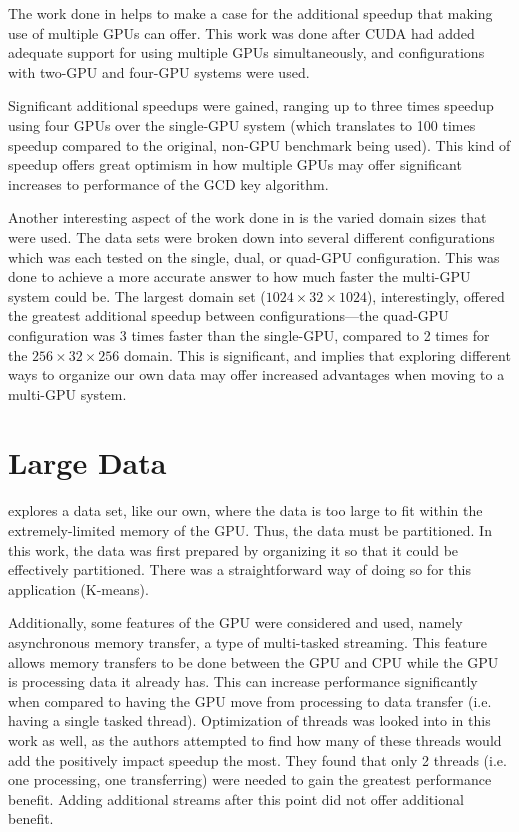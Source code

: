 \documentclass[12pt]{ucthesis}
\begin{document}
The work done in \cite{thibault2009cuda} helps to make a case for the
additional speedup that making use of multiple GPUs can offer. This work was
done after CUDA had added adequate support for using multiple GPUs
simultaneously, and configurations with two-GPU and four-GPU systems were used.

Significant additional speedups were gained, ranging up to three times speedup
using four GPUs over the single-GPU system (which translates to 100 times
speedup compared to the original, non-GPU benchmark being used). This kind of
speedup offers great optimism in how multiple GPUs may offer significant
increases to performance of the GCD key algorithm.

Another interesting aspect of the work done in \cite{thibault2009cuda} is the
varied domain sizes that were used. The data sets were broken down into several
different configurations which was each tested on the single, dual, or quad-GPU
configuration. This was done to achieve a more accurate answer to how much
faster the multi-GPU system could be. The largest domain set
($1024\times32\times1024$), interestingly, offered the greatest additional
speedup between configurations---the quad-GPU configuration was 3 times faster
than the single-GPU, compared to 2 times for the $256\times32\times256$
domain. This is significant, and implies that exploring different ways to
organize our own data may offer increased advantages when moving to a multi-GPU
system.

\section{Large Data}
\label{subsec:largedata}
\cite{wu2009clustering} explores a data set, like our own, where the data is
too large to fit within the extremely-limited memory of the GPU. Thus, the data
must be partitioned. In this work, the data was first prepared by organizing it
so that it could be effectively partitioned. There was a straightforward way of
doing so for this application (K-means).  

Additionally, some features of the GPU were considered and used, namely
asynchronous memory transfer, a type of multi-tasked streaming. This feature
allows memory transfers to be done between the GPU and CPU while the GPU is
processing data it already has. This can increase performance significantly
when compared to having the GPU move from processing to data transfer (i.e.
having a single tasked thread). Optimization of threads was looked into in this
work as well, as the authors attempted to find how many of these threads would
add the positively impact speedup the most. They found that only 2 threads
(i.e. one processing, one transferring) were needed to gain the greatest
performance benefit. Adding additional streams after this point did not offer
additional benefit.
\end{document}
